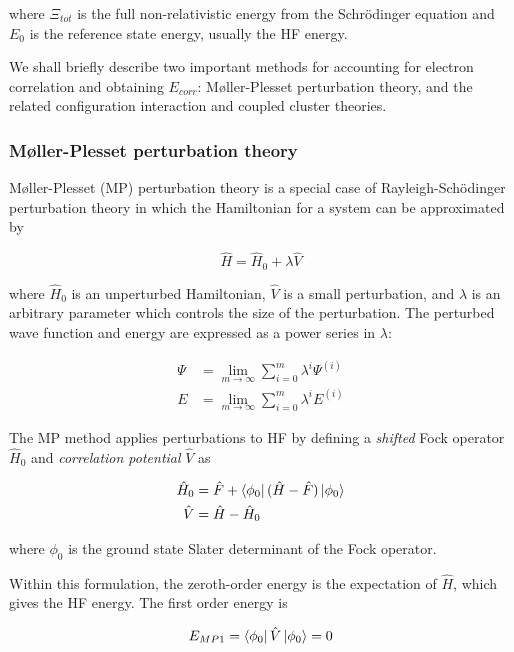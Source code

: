 \noindent where $\Xi_{tot}$ is the full non-relativistic energy from the
Schr{\"o}dinger equation and $E_0$ is the reference state energy, usually the HF
energy.

We shall briefly describe two important methods for accounting for electron
correlation and obtaining $E_{corr}$: M{\o}ller-Plesset perturbation theory, and
the related configuration interaction and coupled cluster theories.

\subsubsection{M{\o}ller-Plesset perturbation theory}

M{\o}ller-Plesset (MP) perturbation theory is a special case of
Rayleigh-Sch{\"o}dinger perturbation theory in which the Hamiltonian for a
system can be approximated by

\begin{equation}
  \hat{H} = \hat{H}_0 + \lambda\hat{V}
\end{equation}

\noindent where $\hat{H}_0$ is an unperturbed Hamiltonian, $\hat{V}$ is a small
perturbation, and $\lambda$ is an arbitrary parameter which controls the size of
the perturbation. The perturbed wave function and energy are expressed as a
power series in $\lambda$:

\begin{align}
 \Psi &= \lim_{m\to\infty} \sum_{i=0}^{m} \lambda^i \Psi^{(i)} \\
  E &= \lim_{m\to\infty} \sum_{i=0}^{m} \lambda^i E^{(i)}
\end{align}

The MP method applies perturbations to HF by defining a \emph{shifted} Fock
operator $\hat{H}_0$ and \emph{correlation potential} $\hat{V}$ as

\begin{align}
  \hat{H}_0 &= \hat{F} + \bra{\phi_0}(\hat{H}-\hat{F})\ket{\phi_0} \\
  \hat{V}   &= \hat{H} - \hat{H}_0
\end{align}

\noindent where $\phi_0$ is the ground state Slater determinant of the Fock
operator.

Within this formulation, the zeroth-order energy is the expectation of
$\hat{H}$, which gives the HF energy. The first order energy is

\begin{equation}
  E_{MP1} = \bra{\phi_0}\hat{V}\ket{\phi_0} = 0
\end{equation}

